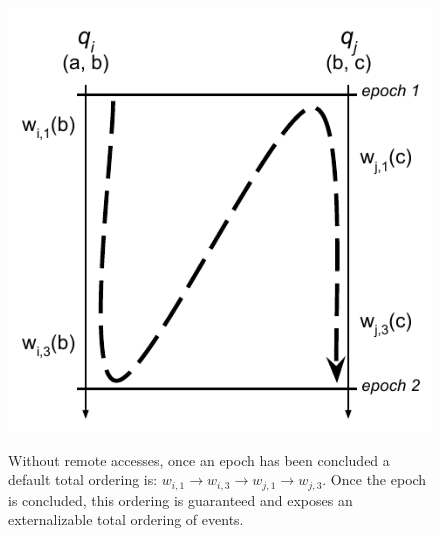 \begin{figure}
    \begin{center}
        \includegraphics[width=5in]{figures/ch03_event_ordering.pdf}
    \end{center}
    \renewcommand{\baselinestretch}{1}
    \small\normalsize

    \begin{quote}
        \caption[Sequential Event Ordering in HC]{Without remote accesses, once an epoch has been concluded a default total ordering is: $w_{i,1}\rightarrow w_{i,3}\rightarrow w_{j,1}\rightarrow w_{j,3}$. Once the epoch is concluded, this ordering is guaranteed and exposes an externalizable total ordering of events.}
        \label{fig:ch03_event_ordering}
    \end{quote}
\end{figure}
\renewcommand{\baselinestretch}{2}
\small\normalsize

